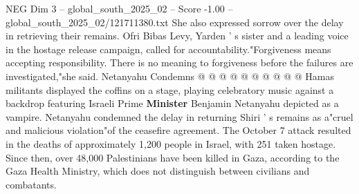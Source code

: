 \begin{textsample}{NEG Dim 3 – global\_south\_2025\_02 – Score -1.00 – global\_south\_2025\_02/121711380.txt}
She also expressed sorrow over the delay in retrieving their remains.
Ofri Bibas Levy, Yarden ' s sister and a leading voice in the hostage release campaign, called for accountability."Forgiveness means accepting responsibility.
There is no meaning to forgiveness before the failures are investigated,"she said.
Netanyahu Condemns @ @ @ @ @ @ @ @ @ @ Hamas militants displayed the coffins on a stage, playing celebratory music against a backdrop featuring Israeli Prime \textbf{Minister} Benjamin Netanyahu depicted as a vampire.
Netanyahu condemned the delay in returning Shiri ' s remains as a"cruel and malicious violation"of the ceasefire agreement.
The October 7 attack resulted in the deaths of approximately 1,200 people in Israel, with 251 taken hostage.
Since then, over 48,000 Palestinians have been killed in Gaza, according to the Gaza Health Ministry, which does not distinguish between civilians and combatants.

\end{textsample}

